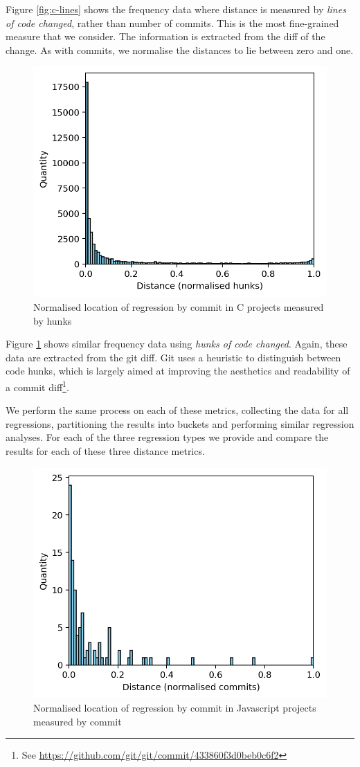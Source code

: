 \documentclass[pdflatex, sn-mathphys, referee]{sn-jnl}%
\theoremstyle{thmstyleone}%
\theoremstyle{thmstyletwo}%
\theoremstyle{thmstylethree}%
\theoremstyle{thmstyleone}
\begin{document}
Figure \ref{fig:c-lines} shows the frequency data where distance is measured by {\it lines of code changed}, rather than number of commits. This is the most fine-grained measure that we consider. The information is extracted from the diff of the change. As with commits, we normalise the distances to lie between zero and one.

\begin{figure}[t]
\centering
\includegraphics[width=0.7\columnwidth]{Fig3}%
\caption{\label{fig:c-blocks}Normalised location of regression by commit in C projects measured by hunks}
\end{figure}

Figure \ref{fig:c-blocks} shows similar frequency data using {\it hunks of code changed}. Again, these data are extracted from the git diff. Git uses a heuristic to distinguish between code hunks, which is largely aimed at improving the aesthetics and readability of a commit diff\footnote{See \url{https://github.com/git/git/commit/433860f3d0beb0c6f2}}.

We perform the same process on each of these metrics, collecting the data for all regressions, partitioning the results into buckets and performing similar regression analyses. For each of the three regression types we provide and compare the results for each of these three distance metrics.

\begin{figure}[t]
\centering
\includegraphics[width=0.7\columnwidth]{Fig11}%
\caption{\label{fig:javascript-commits}Normalised location of regression by commit in Javascript projects measured by commit}
\end{figure}
\end{document}
